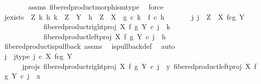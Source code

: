 \begin{isabellebody}
\ \ \ \ \ \ \isamarkupfalse%
\ assms{\isacharparenleft}{\kern0pt}{}{\isacharcomma}{\kern0pt}{}{\isacharparenright}{\kern0pt}\ fibered{\isacharunderscore}{\kern0pt}product{\isacharunderscore}{\kern0pt}morphism{\isacharunderscore}{\kern0pt}type\ \isamarkupfalse%
\ force\isanewline
\ \ \ \ \isamarkupfalse%
\ j{\isacharunderscore}{\kern0pt}exists{\isacharcolon}{\kern0pt}\ {\isachardoublequoteopen}{\isasymAnd}\ Z\ k\ h{\isachardot}{\kern0pt}\ k\ {\isacharcolon}{\kern0pt}\ Z\ {\isasymrightarrow}\ Y\ {\isasymLongrightarrow}\ h\ {\isacharcolon}{\kern0pt}\ Z\ {\isasymrightarrow}\ X\ {\isasymLongrightarrow}\ g\ {\isasymcirc}\isactrlsub c\ k\ {\isacharequal}{\kern0pt}\ f\ {\isasymcirc}\isactrlsub c\ h\ {\isasymLongrightarrow}\isanewline
\ \ \ \ \ \ {\isacharparenleft}{\kern0pt}{\isasymexists}{\isacharbang}{\kern0pt}j{\isachardot}{\kern0pt}\ j\ {\isacharcolon}{\kern0pt}\ Z\ {\isasymrightarrow}\ X\ \isactrlbsub f\isactrlesub {\isasymtimes}\isactrlsub c\isactrlbsub g\isactrlesub \ Y\ {\isasymand}\isanewline
\ \ \ \ \ \ \ \ \ \ \ \ fibered{\isacharunderscore}{\kern0pt}product{\isacharunderscore}{\kern0pt}right{\isacharunderscore}{\kern0pt}proj\ X\ f\ g\ Y\ {\isasymcirc}\isactrlsub c\ j\ {\isacharequal}{\kern0pt}\ k\ {\isasymand}\isanewline
\ \ \ \ \ \ \ \ \ \ \ \ fibered{\isacharunderscore}{\kern0pt}product{\isacharunderscore}{\kern0pt}left{\isacharunderscore}{\kern0pt}proj\ X\ f\ g\ Y\ {\isasymcirc}\isactrlsub c\ j\ {\isacharequal}{\kern0pt}\ h{\isacharparenright}{\kern0pt}{\isachardoublequoteclose}\isanewline
\ \ \ \ \ \ \isamarkupfalse%
\ fibered{\isacharunderscore}{\kern0pt}product{\isacharunderscore}{\kern0pt}is{\isacharunderscore}{\kern0pt}pullback\ assms\ \isamarkupfalse%
\ is{\isacharunderscore}{\kern0pt}pullback{\isacharunderscore}{\kern0pt}def\ \isamarkupfalse%
\ auto\isanewline
\isanewline
\ \ \ \ \isamarkupfalse%
\ j\ \ j{\isacharunderscore}{\kern0pt}type{\isacharcolon}{\kern0pt}\ {\isachardoublequoteopen}j\ {\isasymin}\isactrlsub c\ X\ \isactrlbsub f\isactrlesub {\isasymtimes}\isactrlsub c\isactrlbsub g\isactrlesub \ Y{\isachardoublequoteclose}\ \ \isanewline
\ \ \ \ \ \ j{\isacharunderscore}{\kern0pt}projs{\isacharcolon}{\kern0pt}\ {\isachardoublequoteopen}fibered{\isacharunderscore}{\kern0pt}product{\isacharunderscore}{\kern0pt}right{\isacharunderscore}{\kern0pt}proj\ X\ f\ g\ Y\ {\isasymcirc}\isactrlsub c\ j\ {\isacharequal}{\kern0pt}\ y{\isachardoublequoteclose}\ {\isachardoublequoteopen}fibered{\isacharunderscore}{\kern0pt}product{\isacharunderscore}{\kern0pt}left{\isacharunderscore}{\kern0pt}proj\ X\ f\ g\ Y\ {\isasymcirc}\isactrlsub c\ j\ {\isacharequal}{\kern0pt}\ x{\isachardoublequoteclose}\isanewline

\end{isabellebody}
